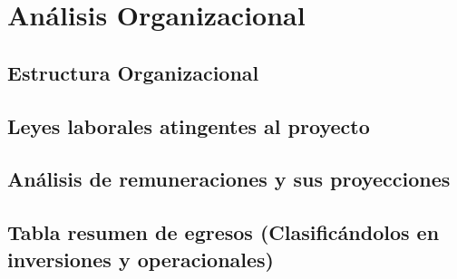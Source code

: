 \section{Análisis Organizacional}
    \subsection{Estructura Organizacional}
    \subsection{Leyes laborales atingentes al proyecto}
    \subsection{Análisis de remuneraciones y sus proyecciones}
    \subsection{Tabla resumen de egresos (Clasificándolos en inversiones y operacionales)}